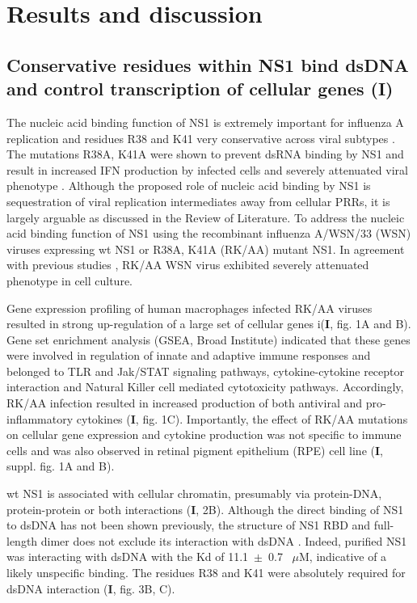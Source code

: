 \clearpage
\section{Results and discussion}

	\subsection{Conservative residues within NS1 bind dsDNA and control transcription of cellular genes (I)}
	
		The nucleic acid binding function of NS1 is extremely important for influenza A replication and residues R38 and K41 very conservative across viral subtypes \parencite{Hatada1992, Zohari2008}. The mutations R38A, K41A were shown to prevent dsRNA binding by NS1 and result in increased IFN production by infected cells and severely attenuated viral phenotype \parencite{Donelan2003}. Although the proposed role of nucleic acid binding by NS1 is sequestration of viral replication intermediates away from cellular \gls{PRR}s, it is largely arguable as discussed in the Review of Literature. To address the nucleic acid binding function of NS1 using the recombinant influenza A/WSN/33 (WSN) viruses expressing \gls{wt} NS1 or R38A, K41A (RK/AA) mutant NS1. In agreement with previous studies \parencite{Min2006}, RK/AA WSN virus exhibited severely attenuated phenotype in cell culture. 
		
		Gene expression profiling of human macrophages infected RK/AA viruses resulted in strong up-regulation of a large set of cellular genes i(\textbf{I}, fig. 1A and B). Gene set enrichment analysis (GSEA, Broad Institute) indicated that these genes were involved in regulation of innate and adaptive immune responses and belonged to TLR and Jak/STAT signaling pathways, cytokine-cytokine receptor interaction and Natural Killer cell mediated cytotoxicity pathways. Accordingly, RK/AA infection resulted in increased production of both antiviral and pro-inflammatory cytokines (\textbf{I}, fig. 1C). Importantly, the effect of RK/AA mutations on cellular gene expression and cytokine production was not specific to immune cells and was also observed in retinal pigment epithelium (RPE) cell line (\textbf{I}, suppl. fig. 1A and B). 
		
		\Gls{wt} NS1 is associated with cellular chromatin, presumably via protein-DNA, protein-protein or both interactions (\textbf{I}, 2B). Although the direct binding of NS1 to dsDNA has not been shown previously, the structure of NS1 RBD and full-length dimer does not exclude its interaction with dsDNA \parencite{Bornholdt2008, Cheng2009}. Indeed, purified NS1 was interacting with dsDNA with the \gls{Kd} of 11.1~$\pm$~0.7~ $\mu$M, indicative of a likely unspecific binding. The residues R38 and K41 were absolutely required for dsDNA interaction (\textbf{I}, fig. 3B, C). 
		

